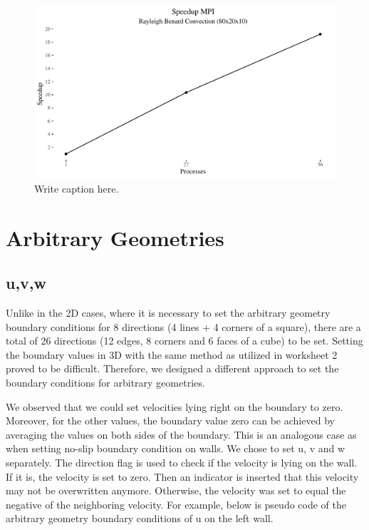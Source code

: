 \documentclass{article}%
\begin{document}
\begin{figure}[htb]
\centering
\includegraphics[width=1\linewidth]{../tests/graphs/speedup_MPI.pdf}
\caption{Write caption here.}
\label{fig:speedup_MPI}
\end{figure}


\section{Arbitrary Geometries}
\subsection{u,v,w}

Unlike in the 2D cases, where it is necessary to set the arbitrary geometry boundary conditions for 8 directions (4 lines + 4 corners of a square), there are a total of 26 directions (12 edges, 8 corners and 6 faces of a cube) to be set. Setting the boundary values in 3D with the same method as utilized in worksheet 2 proved to be difficult.  Therefore, we designed a different approach to set the boundary conditions for arbitrary geometries.

We observed that we could set velocities lying right on the boundary to zero. Moreover, for the other values, the boundary value zero can be achieved by averaging the values on both sides of the boundary. This is an analogous case as when setting no-slip boundary condition on walls. We chose to set u, v and w separately. The direction flag is used to check if the velocity is lying on the wall. If it is, the velocity is set to zero. Then an indicator is inserted that this velocity may not be overwritten anymore. Otherwise, the velocity was set to equal the negative of the neighboring velocity. For example, below is pseudo code of the arbitrary geometry boundary conditions of u on the left wall.
\end{document}
